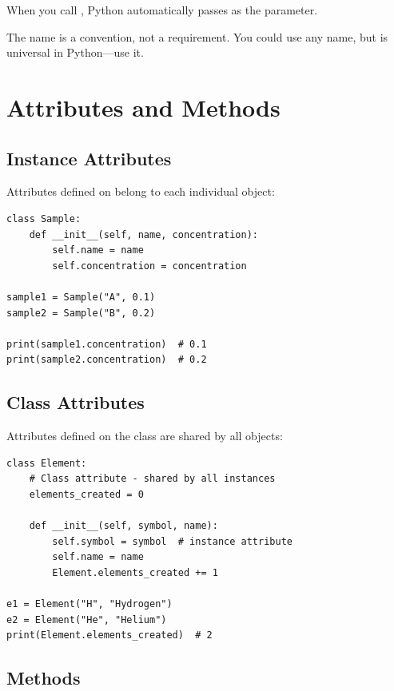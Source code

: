 When you call , Python automatically passes  as the  parameter.

\begin{note}
The name  is a convention, not a requirement. You could use any name, but  is universal in Python---use it.
\end{note}

\section{Attributes and Methods}
\label{sec:attributes-methods}

\subsection{Instance Attributes}

Attributes defined on  belong to each individual object:

\begin{lstlisting}
class Sample:
    def __init__(self, name, concentration):
        self.name = name
        self.concentration = concentration

sample1 = Sample("A", 0.1)
sample2 = Sample("B", 0.2)

print(sample1.concentration)  # 0.1
print(sample2.concentration)  # 0.2
\end{lstlisting}

\subsection{Class Attributes}

Attributes defined on the class are shared by all objects:

\begin{lstlisting}
class Element:
    # Class attribute - shared by all instances
    elements_created = 0

    def __init__(self, symbol, name):
        self.symbol = symbol  # instance attribute
        self.name = name
        Element.elements_created += 1

e1 = Element("H", "Hydrogen")
e2 = Element("He", "Helium")
print(Element.elements_created)  # 2
\end{lstlisting}

\subsection{Methods}

